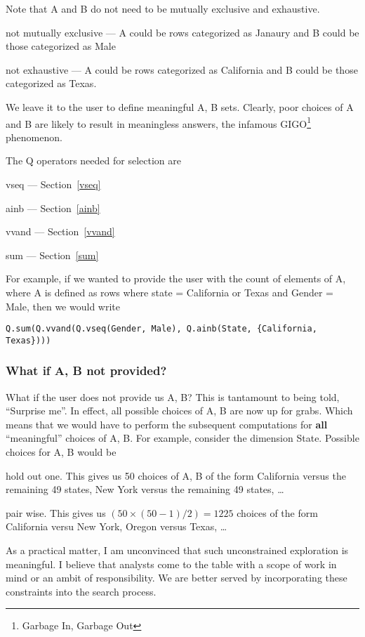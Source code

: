 Note that A and B do not need to be mutually exclusive and exhaustive. 
\bi
\item not mutually exclusive --- 
A could be rows categorized as Janaury and B could be those
categorized as Male
\item not exhaustive  ---
A could be rows categorized as California and B could be those
categorized as Texas. 
\ei

We leave it to the user to define meaningful A, B sets.
Clearly, poor choices of A and B are likely to result in meaningless
answers, the infamous GIGO\footnote{Garbage In, Garbage Out} phenomenon.

The Q operators needed for selection are 
\be
\item vseq --- Section~\ref{vseq}
\item ainb --- Section~\ref{ainb}
\item vvand --- Section~\ref{vvand}
\item sum --- Section~\ref{sum}
\ee

For example, if we wanted to provide the user with the count of elements of A,
where A is defined as rows where state = California or Texas and Gender = Male,
then we would write
\begin{verbatim}
Q.sum(Q.vvand(Q.vseq(Gender, Male), Q.ainb(State, {California, Texas})))
\end{verbatim}


\subsubsection{What if A, B not provided?}

What if the user does not provide us A, B? This is tantamount to being told,
``Surprise me''. In effect, all possible choices of A, B are now up for grabs.
Which means that we would have to perform the subsequent computations for {\bf
all} ``meaningful'' choices of A, B. For example, consider the dimension State.
Possible choices for A, B would be
\be 
\item  hold out one. This gives us 50 choices of A, B of the form California
versus the remaining 49 states, New York versus the remaining 49 states, \ldots
\item pair wise. This gives us \((50 \times (50-1)/2) = 1225\) choices of the
form California versu New York, Oregon versus Texas, \ldots
\ee

As a practical matter, I am unconvinced that such unconstrained exploration is
meaningful. I believe that analysts come to the table with a scope of work in
mind or an ambit of responsibility. We are better served by incorporating these
constraints into the search process.



